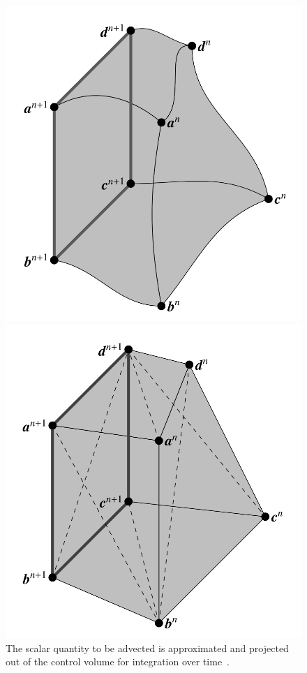 \begin{figure}[htbp]
	\centering
	\begin{minipage}{.45\textwidth}
		\centering
		\includegraphics[width=1.0\linewidth]{figs/streaktube.png}
		\caption{The scalar quantity to be advected is approximated and projected out of the control volume for integration over time~\cite{Owkes2014}. }
		\label{fig:streak}
	\end{minipage}%
\hfill
	\begin{minipage}{0.45\textwidth}
		\centering
		\includegraphics[width=1.0\linewidth]{figs/simplicies}

\end{minipage}
\end{figure}
